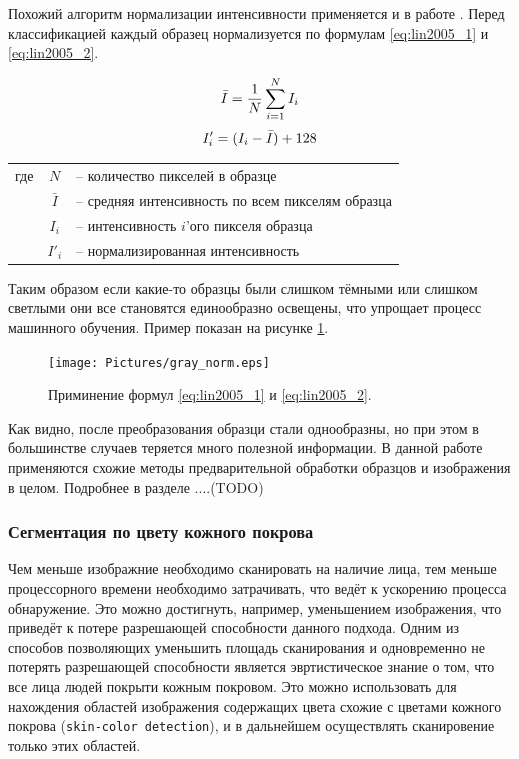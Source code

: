 \documentclass[12pt]{report}
\begin{document}
Похожий алгоритм нормализации интенсивности применяется и в работе \citep{lin2005face}. Перед классификацией каждый образец нормализуется по формулам \ref{eq:lin2005_1} и \ref{eq:lin2005_2}.

\begin{equation}
\label{eq:lin2005_1}
\centering
\bar{I}=\frac{1}{N}\sum_{i=1}^{N}I_{i}
\end{equation}
\begin{equation}
\label{eq:lin2005_2}
\centering
{I}'_i=(I_i-\bar{I})+128
\end{equation}

\begin{tabular}{p{3cm} c l}
где & $N$ & -- количество пикселей в образце\\
	& $\bar{I}$ & -- средняя интенсивность по всем пикселям образца\\
	& $I_i$ & -- интенсивность $i$'ого пикселя образца\\
	& ${I}'_i$ & -- нормализированная интенсивность\\
\end{tabular}

Таким образом если какие-то образцы были слишком тёмными или слишком светлыми они все становятся единообразно освещены, что упрощает процесс машинного обучения. Пример показан на рисунке \ref{fig:gray_norm}.

\begin{figure}[h]
	\centering
	\texttt{[image: Pictures/gray\_norm.eps]}
	\caption{Приминение формул \ref{eq:lin2005_1} и \ref{eq:lin2005_2}.}
	\label{fig:gray_norm}
\end{figure}

Как видно, после преобразования образци стали однообразны, но при этом в большинстве случаев теряется много полезной информации. В данной работе применяются схожие методы предварительной обработки образцов и изображения в целом. Подробнее в разделе ....(TODO)

\subsubsection{Сегментация по цвету кожного покрова}
\label{sec:skin_segm}
Чем меньше изображние необходимо сканировать на наличие лица, тем меньше процессорного времени необходимо затрачивать, что ведёт к ускорению процесса обнаружение. Это можно достигнуть, например, уменьшением изображения, что приведёт к потере разрешающей способности данного подхода. Одним из способов позволяющих уменьшить площадь сканирования и одновременно не потерять разрешающей способности является эвртистическое знание о том, что все лица людей покрыти кожным покровом. Это можно использовать для нахождения областей изображения содержащих цвета схожие с цветами кожного покрова (\texttt{skin-color detection}), и в дальнейшем осуществлять сканировение только этих областей.
\end{document}
